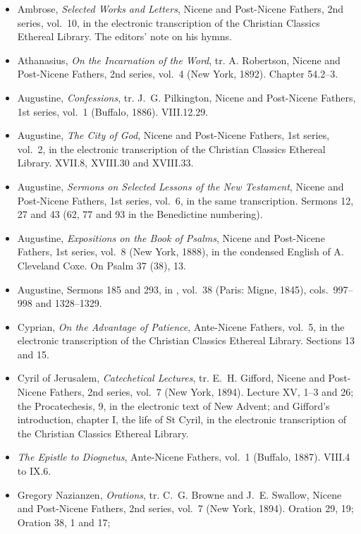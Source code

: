 \begin{itemize}[leftmargin=1.3em, itemsep=0.3em]
\item Ambrose, \textit{Selected Works and Letters}, Nicene and Post-Nicene Fathers, 2nd series,
vol.~10, in the electronic transcription of the Christian Classics Ethereal Library. The editors'
note on his hymns.
\item Athanasius, \textit{On the Incarnation of the Word}, tr. A. Robertson, Nicene and
Post-Nicene Fathers, 2nd series, vol.~4 (New York, 1892). Chapter 54.2--3.
\item Augustine, \textit{Confessions}, tr. J.~G. Pilkington, Nicene and Post-Nicene Fathers, 1st
series, vol.~1 (Buffalo, 1886). VIII.12.29.
\item Augustine, \textit{The City of God}, Nicene and Post-Nicene Fathers, 1st series, vol.~2, in
the electronic transcription of the Christian Classics Ethereal Library. XVII.8, XVIII.30 and
XVIII.33.
\item Augustine, \textit{Sermons on Selected Lessons of the New Testament}, Nicene and Post-Nicene
Fathers, 1st series, vol.~6, in the same transcription. Sermons 12, 27 and 43 (62, 77 and 93 in
the Benedictine numbering).
\item Augustine, \textit{Expositions on the Book of Psalms}, Nicene and Post-Nicene Fathers, 1st
series, vol.~8 (New York, 1888), in the condensed English of A. Cleveland Coxe. On Psalm 37 (38),
13.
\item Augustine, Sermons 185 and 293, in , vol.~38 (Paris: Migne, 1845),
cols.~997--998 and 1328--1329.
\item Cyprian, \textit{On the Advantage of Patience}, Ante-Nicene Fathers, vol.~5, in the
electronic transcription of the Christian Classics Ethereal Library. Sections 13 and 15.
\item Cyril of Jerusalem, \textit{Catechetical Lectures}, tr. E.~H. Gifford, Nicene and
Post-Nicene Fathers, 2nd series, vol.~7 (New York, 1894). Lecture XV, 1--3 and 26; the
Procatechesis, 9, in the electronic text of New Advent; and Gifford's introduction, chapter I, the
life of St Cyril, in the electronic transcription of the Christian Classics Ethereal Library.
\item \textit{The Epistle to Diognetus}, Ante-Nicene Fathers, vol.~1 (Buffalo, 1887). VIII.4 to
IX.6.
\item Gregory Nazianzen, \textit{Orations}, tr. C.~G. Browne and J.~E. Swallow, Nicene and
Post-Nicene Fathers, 2nd series, vol.~7 (New York, 1894). Oration 29, 19; Oration 38, 1 and 17;

\end{itemize}

